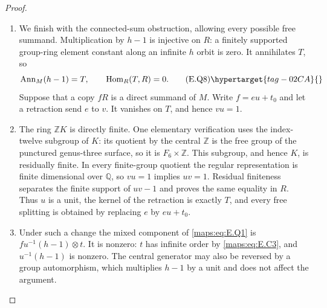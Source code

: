 \begin{proof}
\begin{enumerate}[label={$\langle1\rangle$\arabic*.},leftmargin=*]
is $2h^{-1}a^2-1-a$, which has augmentation zero and hence
annihilates the invariant generator $t$.  The other
coordinates vanish.  The program
\href{https://github.com/KokunoYumeto/s6-complex-structure-workbench/blob/83d76022bcd442278b760db9ff438afceed6c6ea/pro_returns/S6_10_PAPERS_checkpoint_15_20261119T1045Z/S6_10_PAPERS/code/III/maps_cusp_quadratic.py}{\texttt{maps\_cusp\_quadratic.py}} checks these identities
using the identical integral group-ring cancellations as
\ref{maps:src:E.2.16}.  Applying $\Gamma$ to \eqref{maps:eq:E.Q7} in \eqref{maps:eq:E.Q6} gives
\[
 -[(1-h)e+6t,t]
                =[e(h-1),t]-12q(t),
\]
as asserted.  In ordinary coinvariants $t=2v$ and
$E=12v$ for a primitive class $v$.  The quadratic image
is then $-48q(v)$, consistent with the degree-two cup
square evaluated on the normalization; this is a check,
not the proof of \eqref{maps:eq:E.Q1}.

\item We finish with the connected-sum obstruction, allowing
every possible free summand.  Multiplication by $h-1$
is injective on $R$: a finitely supported group-ring
element constant along an infinite $h$ orbit is zero.
It annihilates $T$, so
\[
 \operatorname{Ann}_M(h-1)=T,
                       \qquad\operatorname{Hom}_R(T,R)=0.
 \tag{E.Q8}\hypertarget{tag-02CA}{}\label{maps:eq:E.Q8}
\]
Suppose that a copy $fR$ is a direct summand of $M$.
Write $f=eu+t_0$ and let a retraction send $e$ to $v$.
It vanishes on $T$, and hence $vu=1$.

\item The ring $\mathbb ZK$ is directly finite.  One elementary
verification uses the index-twelve subgroup of $K$:
its quotient by the central $\mathbb Z$ is the free group
of the punctured genus-three surface, so it is
$F_6\times\mathbb Z$.  This subgroup, and hence $K$, is
residually finite.  In every finite-group quotient the
regular representation is finite dimensional over
$\mathbb Q$, so $vu=1$ implies $uv=1$.  Residual
finiteness separates the finite support of $uv-1$ and
proves the same equality in $R$.  Thus $u$ is a unit,
the kernel of the retraction is exactly $T$, and every
free splitting is obtained by replacing $e$ by
$eu+t_0$.

\item Under such a change the mixed component of \eqref{maps:eq:E.Q1} is
$f u^{-1}(h-1)\otimes t$.  It is nonzero: $t$ has
infinite order by \eqref{maps:eq:E.C3}, and $u^{-1}(h-1)$ is nonzero.
The central generator may also be reversed by a group
automorphism, which multiplies $h-1$ by a unit and
does not affect the argument.


\end{enumerate}
\end{proof}

